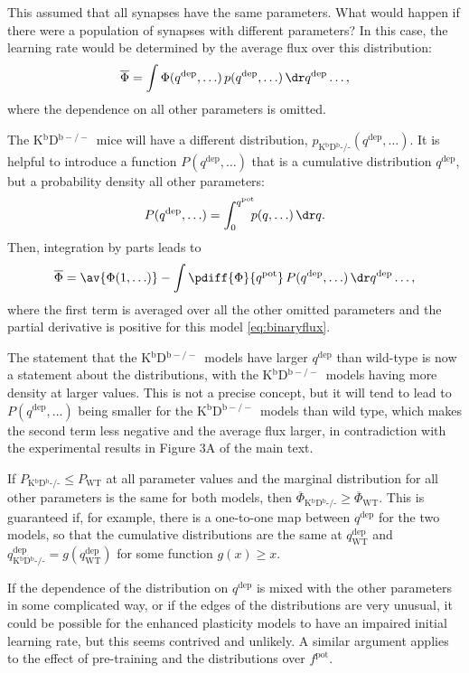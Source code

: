 \documentclass[10pt]{article}
\newcommand{\pot}{^{\text{pot}}}
\newcommand{\dep}{^{\text{dep}}}
\newcommand{\wt}{_{\text{WT}}}
\newcommand{\ko}{_{\text{K$^\mathrm{b}$D$^\mathrm{b}$-/-}}}
\newcommand{\KO}{K$^\mathrm{b}$D$^{\mathrm{b}-/-}$}
\newcommand{\modelfig}[1][A]{Figure 3#1 of the main text}
\begin{document}
This assumed that all synapses have the same parameters.
What would happen if there were a population of synapses with different parameters?
In this case, the learning rate would be determined by the average flux over this distribution:
%
\begin{equation}\label{eq:meanflux}
  \overline{\Phi} = \int \Phi(q\dep, \ldots) \,
                            p(q\dep, \ldots) \,
                          \dr q\dep \ldots,
\end{equation}
%
where the dependence on all other parameters is omitted.

The \KO\ mice will have a different distribution, $p\ko(q\dep, \ldots)$.
It is helpful to introduce a function $P(q\dep, \ldots)$ that is a cumulative distribution \wrt $q\dep$, but a probability density \wrt all other parameters:
%
\begin{equation}\label{eq:cumul}
  P(q\dep, \ldots) = \int_0^{q\pot} \!\!\! p(q, \ldots) \, \dr q.
\end{equation}
%
Then, integration by parts leads to
%
\begin{equation}\label{eq:fluxcumul}
  \overline{\Phi} = \av{\Phi(1, \ldots)} -
             \int \pdiff{\Phi}{q\pot} \,
                            P(q\dep, \ldots) \,
                          \dr q\dep \ldots,
\end{equation}
%
where the first term is averaged over all the other omitted parameters and the partial derivative is positive for this model \eqref{eq:binaryflux}.

The statement that the \KO\ models have larger $q\dep$ than wild-type is now a statement about the distributions, with the \KO\ models having more density at larger values.
This is not a precise concept, but it will tend to lead to $P(q\dep, \ldots)$ being smaller for the \KO\ models than wild type, which makes the second term less negative and the average flux larger, in contradiction with the experimental results in \modelfig.

If $P\ko \leq P\wt$ at all parameter values and the marginal distribution for all other parameters is the same for both models, then $\overline{\Phi}\ko \geq \overline{\Phi}\wt$.
This is guaranteed if, for example, there is a one-to-one map between $q\dep$ for the two models, so that the cumulative distributions are the same at $q\dep\wt$ and $q\dep\ko = g(q\dep\wt)$ for some function $g(x) \geq x$.

If the dependence of the distribution on $q\dep$ is mixed with the other parameters in some complicated way, or if the edges of the distributions are very unusual, it could be possible for the enhanced plasticity models to have an impaired initial learning rate, but this seems contrived and unlikely.
A similar argument applies to the effect of pre-training and the distributions over $f\pot$.
\end{document}
